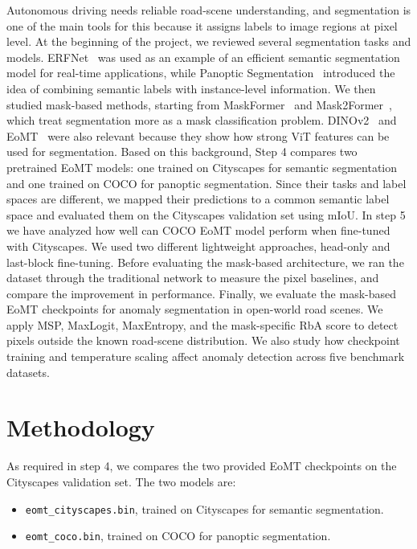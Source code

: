 \documentclass[10pt,twocolumn,letterpaper]{article}
\begin{document}
Autonomous driving needs reliable road-scene understanding, and segmentation is one of the main tools for this because it assigns labels to image regions at pixel level. At the beginning of the project, we reviewed several segmentation tasks and models. ERFNet~\cite{romera2017erfnet} was used as an example of an efficient semantic segmentation model for real-time applications, while Panoptic Segmentation~\cite{kirillov2019panoptic} introduced the idea of combining semantic labels with instance-level information. We then studied mask-based methods, starting from MaskFormer~\cite{cheng2021maskformer} and Mask2Former~\cite{cheng2022mask2former}, which treat segmentation more as a mask classification problem. DINOv2~\cite{oquab2023dinov2} and EoMT~\cite{eomt2025} were also relevant because they show how strong ViT features can be used for segmentation. Based on this background, Step 4 compares two pretrained EoMT models: one trained on Cityscapes for semantic segmentation and one trained on COCO for panoptic segmentation. Since their tasks and label spaces are different, we mapped their predictions to a common semantic label space and evaluated them on the Cityscapes validation set using mIoU. In step 5 we have analyzed how well can COCO EoMT model perform when fine-tuned with Cityscapes. We used two different lightweight approaches, head-only and last-block fine-tuning.
Before evaluating the mask-based architecture, we ran the dataset through the traditional network to measure the pixel baselines, and compare the improvement in performance.
Finally, we evaluate the mask-based EoMT checkpoints for anomaly segmentation in open-world road scenes. We apply MSP, MaxLogit, MaxEntropy, and the mask-specific RbA score to detect pixels outside the known road-scene distribution. We also study how checkpoint training and temperature scaling affect anomaly detection across five benchmark datasets.


\section{Methodology}


As required in step 4, we compares the two provided EoMT checkpoints on the Cityscapes validation set. The two models are:

\begin{itemize}
    \item \texttt{eomt\_cityscapes.bin}, trained on Cityscapes for semantic segmentation.
    \item \texttt{eomt\_coco.bin}, trained on COCO for panoptic segmentation.
\end{itemize}
\end{document}
